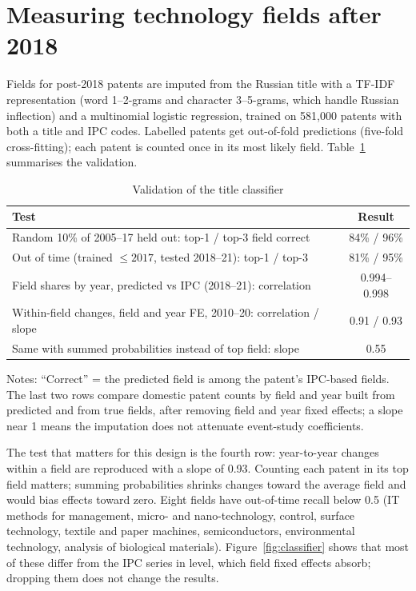 \documentclass[11pt,a4paper]{article}
\begin{document}
\section{Measuring technology fields after 2018}\label{sec:classifier}

Fields for post-2018 patents are imputed from the Russian title with a TF-IDF representation (word 1--2-grams
and character 3--5-grams, which handle Russian inflection) and a multinomial logistic regression, trained on
581,000 patents with both a title and IPC codes. Labelled patents get out-of-fold predictions (five-fold
cross-fitting); each patent is counted once in its most likely field. Table~\ref{tab:classifier} summarises the
validation.

\begin{table}[ht]
\centering
\begin{threeparttable}
\caption{Validation of the title classifier}\label{tab:classifier}
\small
\begin{tabular}{lc}
\toprule
Test & Result \\
\midrule
Random 10\% of 2005--17 held out: top-1 / top-3 field correct & 84\% / 96\% \\
Out of time (trained $\le 2017$, tested 2018--21): top-1 / top-3 & 81\% / 95\% \\
Field shares by year, predicted vs IPC (2018--21): correlation & 0.994--0.998 \\
Within-field changes, field and year FE, 2010--20: correlation / slope & 0.91 / 0.93 \\
Same with summed probabilities instead of top field: slope & 0.55 \\
\bottomrule
\end{tabular}
\begin{tablenotes}\footnotesize
\item Notes: ``Correct'' = the predicted field is among the patent's IPC-based fields. The last two rows compare
domestic patent counts by field and year built from predicted and from true fields, after removing field and year
fixed effects; a slope near 1 means the imputation does not attenuate event-study coefficients.
\end{tablenotes}
\end{threeparttable}
\end{table}

The test that matters for this design is the fourth row: year-to-year changes within a field are reproduced with
a slope of 0.93. Counting each patent in its top field matters; summing probabilities shrinks changes toward the
average field and would bias effects toward zero. Eight fields have out-of-time recall below 0.5 (IT methods for
management, micro- and nano-technology, control, surface technology, textile and paper machines, semiconductors,
environmental technology, analysis of biological materials). Figure~\ref{fig:classifier} shows that most of these
differ from the IPC series in level, which field fixed effects absorb; dropping them does not change the results.
\end{document}
